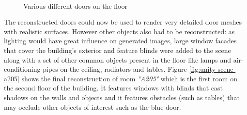 \begin{figure}[htp]
{    }\\%
    \quad
    \caption{Various different doors on the floor}
    \label{fig:doors}
\end{figure}

The reconstructed doors could now be used to render very detailed door meshes with realistic surfaces. However other objects also had to be reconstructed: as lighting would have great influence on generated images, large window facades that cover the building's exterior and feature blinds were added to the scene along with a set of other common objects present in the floor like lamps and air-conditioning pipes on the ceiling, radiators and tables. Figure \ref{fig:unity-scene-a205} shows the final reconstruction of room \textit{"A205"} which is the first room on the second floor of the building. It features windows with blinds that cast shadows on the walls and objects and it features obstacles (such as tables) that may occlude other objects of interest such as the blue door.


